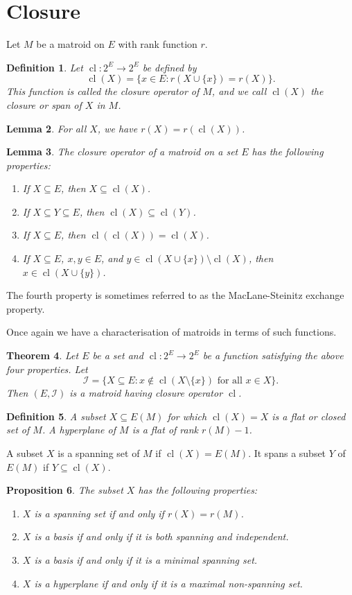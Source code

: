 \documentclass[11pt,letterpaper]{article}
\newcommand{\I}{\mathcal{I}}
\DeclareMathOperator{\cl}{cl}
\theoremstyle{appendix-result}
\newtheorem{theorem}{Theorem}[section]
\newtheorem{lemma}[theorem]{Lemma}
\newtheorem{proposition}[theorem]{Proposition}
\theoremstyle{appendix-definition}
\newtheorem{definition}[theorem]{Definition}
\begin{document}
\section{Closure}
Let $M$ be a matroid on $E$ with rank function $r$.
\begin{definition}
    Let $\cl \colon 2^E \to 2^E$ be defined by
    \[\cl(X) = \{x \in E: r(X \cup \{x\}) = r(X)\}.\]
    This function is called the closure operator of $M$, and we call $\cl(X)$ the closure or span of $X$ in $M$.
\end{definition}
\begin{lemma}
    For all $X$, we have $r(X) = r(\cl(X))$.
\end{lemma}
\begin{lemma}
    The closure operator of a matroid on a set $E$ has the following properties:
    \begin{enumerate}
        \item If $X \subseteq E$, then $X \subseteq \cl(X)$.
        \item If $X \subseteq Y \subseteq E$, then $\cl(X) \subseteq \cl(Y)$.
        \item If $X \subseteq E$, then $\cl(\cl(X)) = \cl(X)$.
        \item If $X \subseteq E$, $x,y\in E$, and $y \in \cl(X \cup \{x\})\setminus\cl(X)$, then $x \in \cl(X \cup \{y\})$.
    \end{enumerate}
\end{lemma}
The fourth property is sometimes referred to as the MacLane-Steinitz exchange property.
\par Once again we have a characterisation of matroids in terms of such functions.
\begin{theorem}
    Let $E$ be a set and $\cl \colon 2^E \to 2^E$ be a function satisfying the above four properties. Let
    \[\I = \{X \subseteq E: x \notin \cl(X\setminus\{x\}) \text{ for all $x \in X$}\}.\]
    Then $(E, \I)$ is a matroid having closure operator $\cl$.
\end{theorem}
\begin{definition}
    A subset $X\subseteq E(M)$ for which $\cl(X)=X$ is a flat or closed set of $M$. A hyperplane of $M$ is a flat of rank $r(M)-1$.
\end{definition}
A subset $X$ is a spanning set of $M$ if $\cl(X) = E(M)$. It spans a subset $Y$ of $E(M)$ if $Y \subseteq \cl(X)$.
\begin{proposition}
    The subset $X$ has the following properties:
    \begin{enumerate}
        \item $X$ is a spanning set if and only if $r(X) = r(M)$.
        \item $X$ is a basis if and only if it is both spanning and independent.
        \item $X$ is a basis if and only if it is a minimal spanning set.
        \item $X$ is a hyperplane if and only if it is a maximal non-spanning set.
    \end{enumerate}
\end{proposition}
\end{document}
